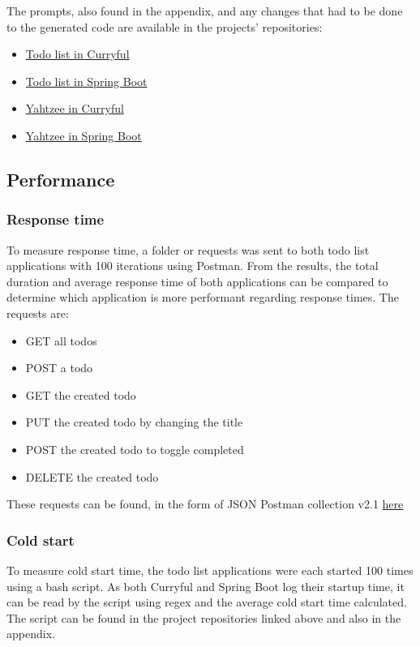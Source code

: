 \documentclass[a4paper,titlepage]{article}
\begin{document}
The prompts, also found in the appendix, and any changes that had to
be done to the generated code are available in the projects' repositories:
\begin{itemize}
	\item \hyperlink{https://github.com/lerchl/curryful-bachelor-thesis-curryful-todo-list}{Todo list in Curryful}
	\item \hyperlink{https://github.com/lerchl/curryful-bachelor-thesis-spring-boot-todo-list}{Todo list in Spring Boot}
	\item \hyperlink{https://github.com/lerchl/curryful-bachelor-thesis-curryful-yahtzee}{Yahtzee in Curryful}
	\item \hyperlink{https://github.com/lerchl/curryful-bachelor-thesis-spring-boot-yahtzee}{Yahtzee in Spring Boot}
\end{itemize}

\subsection{Performance}
\subsubsection{Response time}
To measure response time, a folder or requests was sent to both todo list
applications with 100 iterations using Postman. From the results, the total
duration and average response time of both applications can be compared to
determine which application is more performant regarding response times. The
requests are:

\begin{itemize}
	\item GET all todos
	\item POST a todo
	\item GET the created todo
	\item PUT the created todo by changing the title
	\item POST the created todo to toggle completed
	\item DELETE the created todo
\end{itemize}

These requests can be found, in the form of JSON Postman collection v2.1
\hyperlink{https://github.com/lerchl/curryful-bachelor-thesis-postman-requests}{here}

\subsubsection{Cold start}
To measure cold start time, the todo list applications were each started 100
times using a bash script. As both Curryful and Spring Boot log their startup
time, it can be read by the script using regex and the average cold start time
calculated. The script can be found in the project repositories linked above and
also in the appendix.\newline
\end{document}

